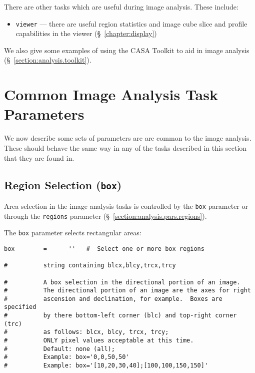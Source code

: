 There are other tasks which are useful during image analysis.  These
include:
\begin{itemize}
   \item {\tt viewer} --- there are useful region statistics and
         image cube slice and profile capabilities in the viewer 
         (\S~\ref{chapter:display})
\end{itemize}

We also give some examples of using the CASA Toolkit to aid in
image analysis (\S~\ref{section:analysis.toolkit}).

\section{Common Image Analysis Task Parameters}
\label{section:analysis.pars}

We now describe some sets of parameters are are common to the image
analysis.  These should behave the same way in any of the tasks
described in this section that they are found in.  

\subsection{Region Selection ({\tt box})}
\label{section:analysis.pars.box}

Area selection in the image analysis tasks is controlled by
the {\tt box} parameter or through the {\tt regions}
parameter (\S~\ref{section:analysis.pars.regions}).

The {\tt box} parameter selects rectangular areas:
\small
\begin{verbatim}
box        =      ''   #  Select one or more box regions

#          string containing blcx,blcy,trcx,trcy

#          A box selection in the directional portion of an image.
#          The directional portion of an image are the axes for right
#          ascension and declination, for example.  Boxes are specified
#          by there bottom-left corner (blc) and top-right corner (trc)
#          as follows: blcx, blcy, trcx, trcy;
#          ONLY pixel values acceptable at this time.
#          Default: none (all);
#          Example: box='0,0,50,50'
#          Example: box='[10,20,30,40];[100,100,150,150]'

\end{verbatim}
\normalsize

